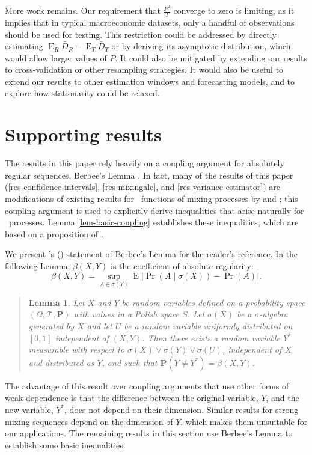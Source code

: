 \documentclass[11pt]{article}
\newtheorem{lem}[thm]{Lemma}
\DeclareMathOperator{\E}{E}
\newcommand{\oosA}{\bar{D}_{R}}
\newcommand{\oosB}{\bar{D}_{T}}
\begin{document}
More work remains.  Our requirement that $\frac{P^2}{T}$ converge to
zero is limiting, as it implies that in typical macroeconomic
datasets, only a handful of observations should be used for testing.
This restriction could be addressed by directly estimating $\E_R \oosA
- \E_T \oosB$ or by deriving its asymptotic distribution, which would
allow larger values of $P$.  It could also be mitigated by extending
our results to cross-validation or other resampling strategies.  It
would also be useful to extend our results to other estimation windows
and forecasting models, and to explore how stationarity could be
relaxed.

\appendix
\section{Supporting results}
The results in this paper rely heavily on a coupling argument for
absolutely regular sequences, Berbee's Lemma \citep{Ber:79}.  In fact,
many of the results of this paper (\ref{res-confidence-intervals},
\ref{res-mixingale}, and \ref{res-variance-estimator}) are
modifications of existing results for \ned\ functions of mixing
processes by \citet{Jon:97} and
\citet{JoD:00}; this coupling argument is used to
explicitly derive inequalities that arise naturally for \ned\
processes.  Lemma \ref{lem-basic-coupling} establishes these
inequalities, which are based on a proposition of
\citet{MeP:02}.

We present \citeauthor{MeP:02}'s
(\citeyear{MeP:02}) statement of Berbee's Lemma for
the reader's reference.  In the following Lemma, $\beta(X,Y)$ is the
coefficient of absolute regularity:
\[
\beta(X,Y) = \sup_{A \in \sigma(Y)} \E \lvert \Pr(A \mid \sigma(X))
  - \Pr(A) \rvert.
\]
\begin{quotation}
\begin{lem}\label{lem-berbee}
  Let $X$ and $Y$ be random variables defined on a probability space
  $(\Omega, \mathcal{T}, \mathbf{P})$ with values in a Polish space
  $S$.  Let $\sigma(X)$ be a $\sigma$-algebra generated by $X$ and let
  $U$ be a random variable uniformly distributed on $[0,1]$
  independent of $(X,Y)$.  Then there exists a random variable $Y^{*}$
  measurable with respect to $\sigma(X) \vee \sigma(Y) \vee
  \sigma(U)$, independent of $X$ and distributed as $Y$, and such that
  $\mathbf{P}(Y \neq Y^{*}) = \beta(X,Y)$.
\end{lem}
\noindent\citep{MeP:02}
\end{quotation}

The advantage of this result over coupling arguments that use other
forms of weak dependence is that the difference between the original
variable, $Y$, and the new variable, $Y^{*}$, does not depend on their
dimension.  Similar results for strong mixing sequences depend on the
dimension of $Y$, which makes them unsuitable for our applications.
The remaining results in this section use Berbee's Lemma to establish
some basic inequalities.
\end{document}
